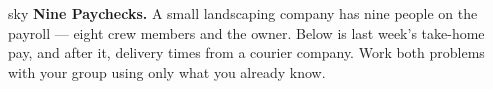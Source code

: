 \documentclass[12pt]{article}
\begin{document}

\vspace{0.02in}

\begin{headlinebox}{sky}
\textbf{Nine Paychecks.} A small landscaping company has nine people on the payroll --- eight
crew members and the owner. Below is last week's take-home pay, and after it, delivery times
from a courier company. Work both problems with your group using only what you already know.
\end{headlinebox}

\vspace{0.04in}
\end{document}
